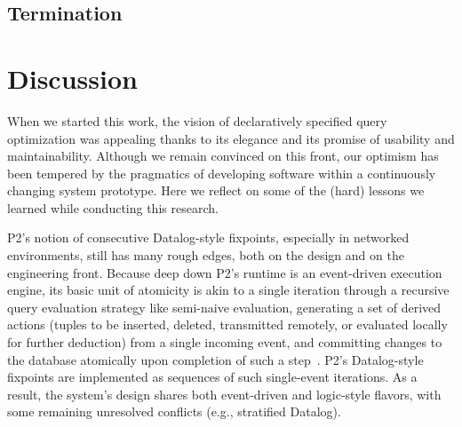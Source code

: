 

\subsection{Termination}
\label{ch:opt:sec:cascadesend}


\section{Discussion}
\label{ch:opt:sec:discussion}

When we started this work, the vision of declaratively specified query
optimization was appealing thanks to its elegance and its promise of usability
and maintainability.  Although we remain convinced on this front, our optimism
has been tempered by the pragmatics of developing software within a
continuously changing system prototype.  Here we reflect on some of the (hard)
lessons we learned while conducting this research.

P2's notion of consecutive Datalog-style fixpoints, especially in networked
environments, still has many rough edges, both on the design and on the
engineering front.  Because deep down P2's runtime is an event-driven execution
engine, its basic unit of atomicity is akin to a single iteration through a
recursive query evaluation strategy like semi-naive evaluation, generating a
set of derived actions (tuples to be inserted, deleted, transmitted remotely,
or evaluated locally for further deduction) from a single incoming event, and
committing changes to the database atomically upon completion of such a
step~\cite{LuThesis}.  P2's Datalog-style fixpoints are implemented as
sequences of such single-event iterations.  As a result, the system's design
shares both event-driven and logic-style flavors, with some remaining
unresolved conflicts (e.g., stratified Datalog).

